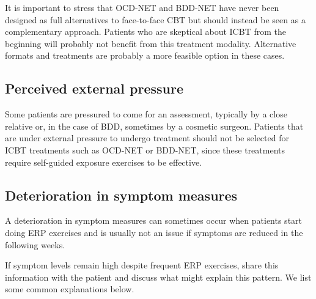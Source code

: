 \documentclass[]{book}
\theoremstyle{definition}
\theoremstyle{definition}
\theoremstyle{definition}
\theoremstyle{remark}
\begin{document}
It is important to stress that OCD-NET and BDD-NET have never been
designed as full alternatives to face-to-face CBT but should instead be
seen as a complementary approach. Patients who are skeptical about ICBT
from the beginning will probably not benefit from this treatment
modality. Alternative formats and treatments are probably a more
feasible option in these cases.

\hypertarget{perceived-external-pressure}{%
\subsection{Perceived external
pressure}\label{perceived-external-pressure}}

Some patients are pressured to come for an assessment, typically by a
close relative or, in the case of BDD, sometimes by a cosmetic surgeon.
Patients that are under external pressure to undergo treatment should
not be selected for ICBT treatments such as OCD-NET or BDD-NET, since
these treatments require self-guided exposure exercises to be effective.

\hypertarget{deterioration-in-symptom-measures}{%
\subsection{Deterioration in symptom
measures}\label{deterioration-in-symptom-measures}}

A deterioration in symptom measures can sometimes occur when patients
start doing ERP exercises and is usually not an issue if symptoms are
reduced in the following weeks.

If symptom levels remain high despite frequent ERP exercises, share this
information with the patient and discuss what might explain this
pattern. We list some common explanations below.
\end{document}
